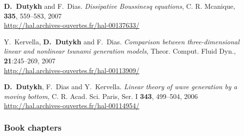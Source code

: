 \documentclass[final, a4paper, oneside, 12pt]{article}
\numberwithin{equation}{section}
\begin{document}
\begin{etaremune}
  \item \textbf{D.~Dutykh} and F.~Dias. \textit{Dissipative Boussinesq equations}, C. R. Mcanique, \textbf{335}, 559--583, 2007 \\ %
  \url{http://hal.archives-ouvertes.fr/hal-00137633/}
  
  \item  Y.~Kervella, \textbf{D.~Dutykh} and F.~Dias. \textit{Comparison between three-dimensional linear and nonlinear tsunami generation models}, Theor. Comput. Fluid Dyn., \textbf{21}:245--269, 2007 \\ %
  \url{http://hal.archives-ouvertes.fr/hal-00113909/}
  
  
  
  \item \textbf{D.~Dutykh}, F.~Dias and Y.~Kervella. \textit{Linear theory of wave generation by a moving bottom}, C. R. Acad. Sci. Paris, Ser. I \textbf{343}, 499--504, 2006 \\ %
  \url{http://hal.archives-ouvertes.fr/hal-00114954/}
 
\end{etaremune}

\subsubsection{Book chapters}
\end{document}
